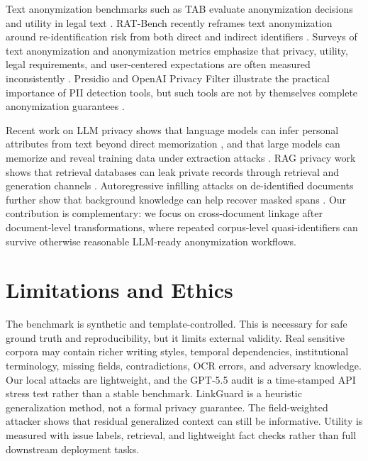 \documentclass{article}
\newcommand{\method}{LinkGuard}
\begin{document}
Text anonymization benchmarks such as TAB evaluate anonymization decisions and utility in legal text \citep{pilan2022tab}.
RAT-Bench recently reframes text anonymization around re-identification risk from both direct and indirect identifiers \citep{krco2026ratbench}.
Surveys of text anonymization and anonymization metrics emphasize that privacy, utility, legal requirements, and user-centered expectations are often measured inconsistently \citep{deusser2025textanon,ren2025metrics}.
Presidio and OpenAI Privacy Filter illustrate the practical importance of PII detection tools, but such tools are not by themselves complete anonymization guarantees \citep{presidio,openai2026privacyfilter}.

Recent work on LLM privacy shows that language models can infer personal attributes from text beyond direct memorization \citep{staab2024beyond}, and that large models can memorize and reveal training data under extraction attacks \citep{carlini2021extracting,nasr2023scalable}.
RAG privacy work shows that retrieval databases can leak private records through retrieval and generation channels \citep{zeng2024ragprivacy}.
Autoregressive infilling attacks on de-identified documents further show that background knowledge can help recover masked spans \citep{charpentier2025infilling}.
Our contribution is complementary: we focus on cross-document linkage after document-level transformations, where repeated corpus-level quasi-identifiers can survive otherwise reasonable LLM-ready anonymization workflows.

\section{Limitations and Ethics}

The benchmark is synthetic and template-controlled.
This is necessary for safe ground truth and reproducibility, but it limits external validity.
Real sensitive corpora may contain richer writing styles, temporal dependencies, institutional terminology, missing fields, contradictions, OCR errors, and adversary knowledge.
Our local attacks are lightweight, and the GPT-5.5 audit is a time-stamped API stress test rather than a stable benchmark.
\method{} is a heuristic generalization method, not a formal privacy guarantee.
The field-weighted attacker shows that residual generalized context can still be informative.
Utility is measured with issue labels, retrieval, and lightweight fact checks rather than full downstream deployment tasks.
\end{document}
